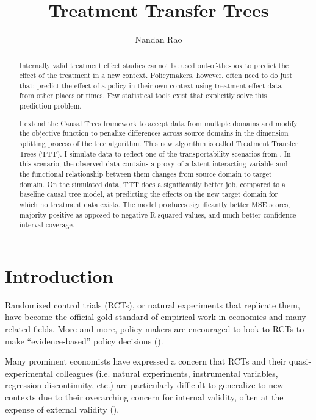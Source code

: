 \documentclass[a4paper,12pt]{article}
\title{ Treatment Transfer Trees }
\author{Nandan Rao}
\theoremstyle{proposition}
\begin{document}
\maketitle

\begin{abstract}

Internally valid treatment effect studies cannot be used out-of-the-box to predict the effect of the treatment in a new context. Policymakers, however, often need to do just that: predict the effect of a policy in their own context using treatment effect data from other places or times. Few statistical tools exist that explicitly solve this prediction problem.

I extend the Causal Trees framework \parencite{Athey2016} to accept data from multiple domains and modify the objective function to penalize differences across source domains in the dimension splitting process of the tree algorithm. This new algorithm is called Treatment Transfer Trees (TTT). I simulate data to reflect one of the transportability scenarios from \cite{Pearl2014}. In this scenario, the observed data contains a proxy of a latent interacting variable and the functional relationship between them changes from source domain to target domain. On the simulated data, TTT does a significantly better job, compared to a baseline causal tree model, at predicting the effects on the new target domain for which no treatment data exists. The model produces significantly better MSE scores, majority positive as opposed to negative R squared values, and much better confidence interval coverage.

\end{abstract}

\clearpage

\section{Introduction}

Randomized control trials (RCTs), or natural experiments that replicate them, have become the official gold standard of empirical work in economics and many related fields. More and more, policy makers are encouraged to look to RCTs to make ``evidence-based'' policy decisions (\cite{Manski2013, Cartwright2013}).

Many prominent economists have expressed a concern that RCTs and their quasi-experimental colleagues (i.e. natural experiments, instrumental variables, regression discontinuity, etc.) are particularly difficult to generalize to new contexts due to their overarching concern for internal validity, often at the expense of external validity (\cite{Heckman1995, Heckman2008, Deaton2010, Manski2013, Deaton2018}).
\end{document}
